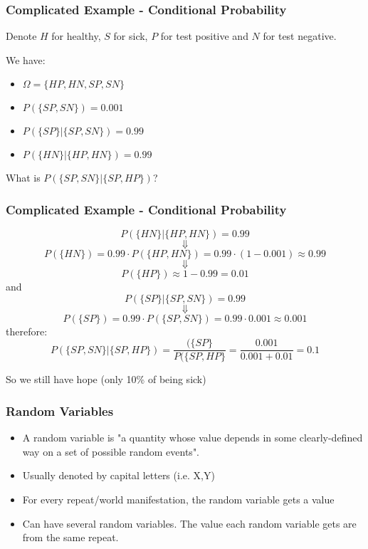 \documentclass{beamer}
\begin{document}

\begin{frame}
\frametitle{Complicated Example - Conditional Probability}
Denote $H$ for healthy, $S$ for sick, $P$ for test positive and $N$ for test negative.

We have:
\begin{itemize}
\item $\Omega=\{HP,HN,SP,SN\}$
\item $P(\{SP,SN\})=0.001$
\item $P(\{SP\}|\{SP,SN\})=0.99$
\item $P(\{HN\}|\{HP,HN\})=0.99$
\end{itemize}
What is $P(\{SP,SN\}|\{SP,HP\})$?
\end{frame}

\begin{frame}
\frametitle{Complicated Example - Conditional Probability}
$$P(\{HN\}|\{HP,HN\})=0.99$$ $$\Downarrow$$ $$P(\{HN\})=0.99 \cdot P(\{HP,HN\})=0.99 \cdot (1-0.001) \approx 0.99$$ $$\Downarrow$$ $$P(\{HP\}) \approx 1-0.99=0.01$$
and
$$P(\{SP\}|\{SP,SN\})=0.99$$ $$\Downarrow$$ $$P(\{SP\})=0.99 \cdot P(\{SP,SN\})=0.99 \cdot 0.001 \approx 0.001$$
therefore:
$$P(\{SP,SN\}|\{SP,HP\})=\frac{(\{SP\}}{P(\{SP,HP\}}=\frac{0.001}{0.001+0.01}=0.1 $$

So we still have hope (only 10\% of being sick)
\end{frame}

\begin{frame}
\frametitle{Random Variables}
\begin{itemize}
\item A random variable is "a quantity whose value depends in some clearly-defined way on a set of possible random events".
\item Usually denoted by capital letters (i.e. X,Y)
\item For every repeat/world manifestation, the random variable gets a value
\item Can have several random variables. The value each random variable gets are from the same repeat.
\end{itemize}

\end{frame}
\end{document}
